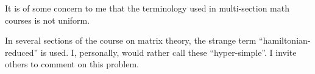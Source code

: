 \documentclass{sample}
\begin{document}
It is of some concern to me   that 
the terminology used in  multi-section
 math courses is not uniform.

In several sections of the course on 
matrix theory, the strange term   
 ``hamiltonian-reduced'' is used. 
  I, personally, would rather call these 
 ``hyper-simple''. I
invite others to comment on this  problem.
\end{document}
